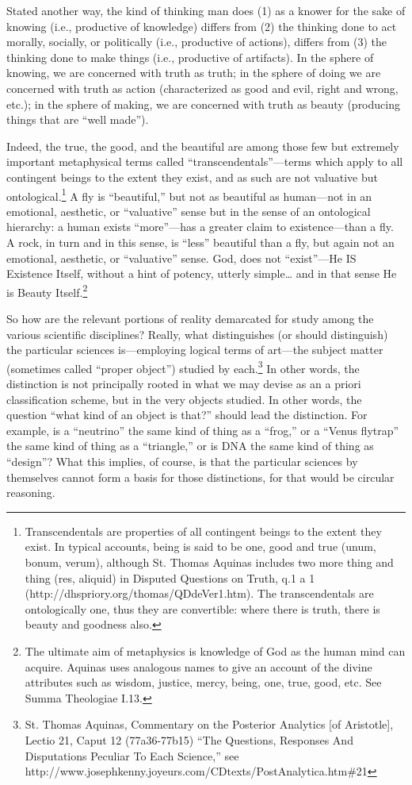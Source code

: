Stated another way, the kind of thinking man does (1) as a knower for the sake of knowing (i.e., productive of knowledge) differs from (2) the thinking done to act morally, socially, or politically (i.e., productive of actions), differs from (3) the thinking done to make things (i.e., productive of artifacts). In the sphere of knowing, we are concerned with truth as truth; in the sphere of doing we are concerned with truth as action (characterized as good and evil, right and wrong, etc.); in the sphere of making, we are concerned with truth as beauty (producing things that are “well made”).

Indeed, the true, the good, and the beautiful are among those few but extremely important metaphysical terms called “transcendentals”—terms which apply to all contingent beings to the extent they exist, and as such are not valuative but ontological.\footnote{Transcendentals are properties of all contingent beings to the extent they exist. In typical accounts, being is said to be one, good and true (unum, bonum, verum), although St. Thomas Aquinas includes two more thing and thing (res, aliquid) in Disputed Questions on Truth, q.1 a 1 (http://dhspriory.org/thomas/QDdeVer1.htm). The transcendentals are ontologically one, thus they are convertible: where there is truth, there is beauty and goodness also.} A fly is “beautiful,” but not as beautiful as human—not in an emotional, aesthetic, or “valuative” sense but in the sense of an ontological hierarchy: a human exists “more”—has a greater claim to existence—than a fly. A rock, in turn and in this sense, is “less” beautiful than a fly, but again not an emotional, aesthetic, or “valuative” sense. God, does not “exist”—He IS Existence Itself, without a hint of potency, utterly simple… and in that sense He is Beauty Itself.\footnote{The ultimate aim of metaphysics is knowledge of God as the human mind can acquire. Aquinas uses analogous names to give an account of the divine attributes such as wisdom, justice, mercy, being, one, true, good, etc. See Summa Theologiae I.13.}

So how are the relevant portions of reality demarcated for study among the various scientific disciplines? Really, what distinguishes (or should distinguish) the particular sciences is—employing logical terms of art—the subject matter (sometimes called “proper object”) studied by each.\footnote{St. Thomas Aquinas, Commentary on the Posterior Analytics [of Aristotle], Lectio 21, Caput 12 (77a36-77b15) “The Questions, Responses And Disputations Peculiar To Each Science,” see http://www.josephkenny.joyeurs.com/CDtexts/PostAnalytica.htm\#21} In other words, the distinction is not principally rooted in what we may devise as an a priori classification scheme, but in the very objects studied. In other words, the question “what kind of an object is that?” should lead the distinction. For example, is a “neutrino” the same kind of thing as a “frog,” or a “Venus flytrap” the same kind of thing as a “triangle,” or is DNA the same kind of thing as “design”? What this implies, of course, is that the particular sciences by themselves cannot form a basis for those distinctions, for that would be circular reasoning.

